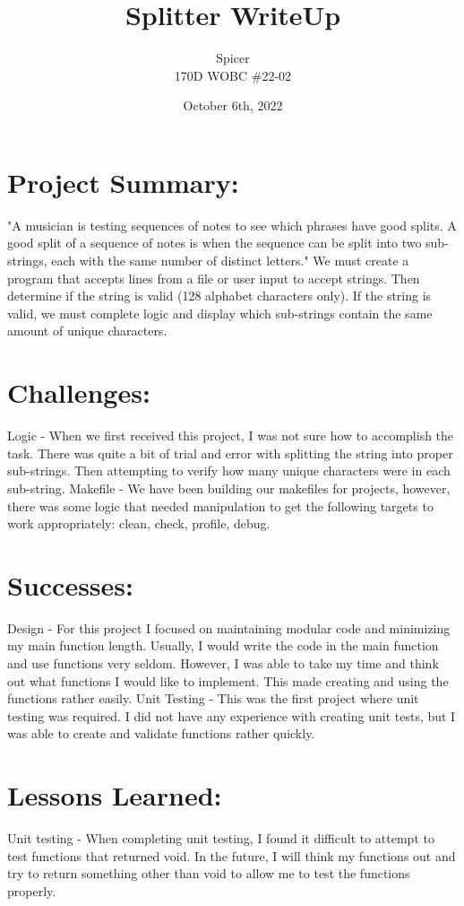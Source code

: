 \documentclass[12pt]{article}
\begin{document}
\title{Splitter WriteUp}
\author{\Kyle Spicer\\ 170D WOBC \#22-02}
\date{October 6th, 2022}

\maketitle

\section{Project Summary:}\label{Project Summary}
"A musician is testing sequences of notes to see which phrases have good splits. A good split of a sequence of notes is when the sequence can be split into two sub-strings, each with the same number of distinct letters."
\newline
\newline
We must create a program that accepts lines from a file or user input to accept strings. Then determine if the string is valid (128 alphabet characters only). If the string is valid, we must complete logic and display which sub-strings contain the same amount of unique characters.

\section{Challenges:}\label{Challenges}
Logic - When we first received this project, I was not sure how to accomplish the task. There was quite a bit of trial and error with splitting the string into proper sub-strings. Then attempting to verify how many unique characters were in each sub-string.
\newline
\newline
Makefile - We have been building our makefiles for projects, however, there was some logic that needed manipulation to get the following targets to work appropriately: clean, check, profile, debug.
\section{Successes:}\label{Successes}
Design - For this project I focused on maintaining modular code and minimizing my main function length. Usually, I would write the code in the main function and use functions very seldom. However, I was able to take my time and think out what functions I would like to implement. This made creating and using the functions rather easily.
\newline
\newline
Unit Testing - This was the first project where unit testing was required. I did not have any experience with creating unit tests, but I was able to create and validate functions rather quickly.

\section{Lessons Learned:}\label{Lessons Learned}
Unit testing - When completing unit testing, I found it difficult to attempt to test functions that returned void. In the future, I will think my functions out and try to return something other than void to allow me to test the functions properly.
\end{document}
